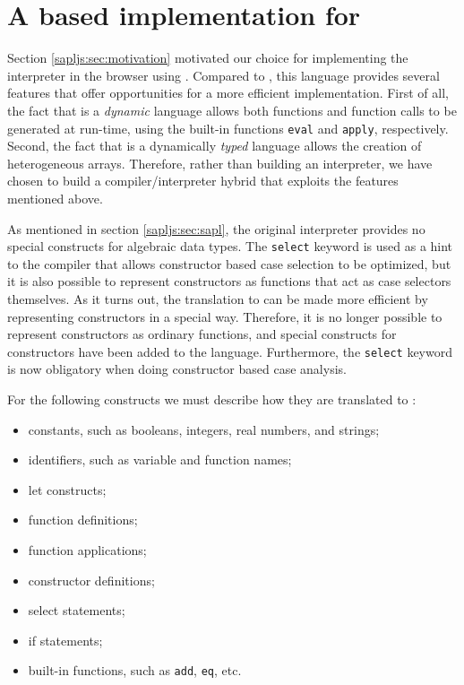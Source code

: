 \section{A \JS based implementation for  \Sapl}
\label{sapljs:sec:sapljs}
Section \ref{sapljs:sec:motivation} motivated our choice for implementing the
\Sapl interpreter in the browser using \JS. Compared to \Java, this language 
provides several features that offer opportunities for a more efficient 
implementation. First of all, the fact that \JS is a \emph{dynamic} language allows both functions and function calls to be generated at run-time, using the 
built-in functions \texttt{eval} and \texttt{apply}, respectively. Second, the 
fact that \JS is a dynamically \emph{typed} language allows the creation of 
heterogeneous arrays. Therefore, rather than building an interpreter, we have 
chosen to build a compiler/interpreter hybrid that exploits the features 
mentioned above.

As mentioned in section \ref{sapljs:sec:sapl}, the original \Sapl interpreter 
provides no special constructs for algebraic data types. The \texttt{select}
keyword is used as a hint to the compiler that allows constructor based case selection to be optimized, but it is also possible to represent constructors 
as functions that act as case selectors themselves. As it turns out, the
translation to \JS can be made more efficient by representing constructors in a
special way. Therefore, it is no longer possible to represent constructors as ordinary functions, and special constructs for constructors have been added to
the language. Furthermore, the \texttt{select} keyword is now obligatory when doing constructor based case analysis.

For the following \Sapl constructs we must describe how they are translated to 
\JS:
\begin{itemize}
	\item constants, such as booleans, integers, real numbers, and strings;
    \item identifiers, such as variable and function names;
    \item let constructs;
	\item function definitions;
	\item function applications;
	\item constructor definitions;
	\item select statements;
	\item if statements;
	\item built-in functions, such as \texttt{add}, \texttt{eq}, etc.
\end{itemize}

